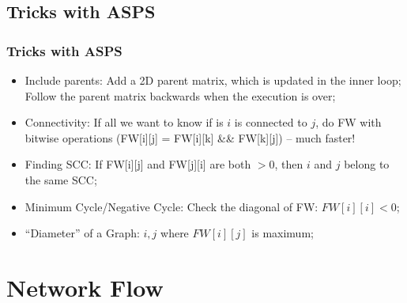 \documentclass{beamer}
\begin{document}
\subsection{Tricks with ASPS}
\begin{frame}
  \frametitle{Tricks with ASPS}

  \begin{itemize}
  \item Include parents: Add a 2D parent matrix, which is updated in
    the inner loop; Follow the parent matrix backwards when the
    execution is over;
  \item Connectivity: If all we want to know if is $i$ is connected to
    $j$, do FW with bitwise operations (FW[i][j] = FW[i][k] \&\&
    FW[k][j]) -- much faster!
  \item Finding SCC: If FW[i][j] and FW[j][i] are both $> 0$, then $i$
    and $j$ belong to the same SCC;
  \item Minimum Cycle/Negative Cycle: Check the diagonal of FW:
    $FW[i][i] < 0$;
  \item ``Diameter'' of a Graph: $i,j$ where $FW[i][j]$ is maximum;
  \end{itemize}
\end{frame}

\section{Network Flow}
\end{document}
